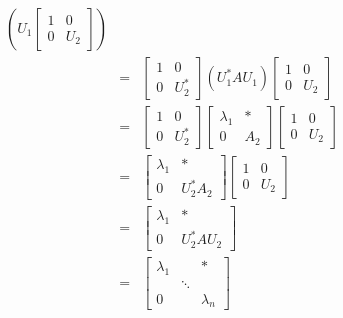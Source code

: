 \documentclass[letterpaper,12pt,fleqn]{article}
\renewcommand{\l}{\lambda}
\begin{document}
\begin{theproof}
\begin{description}
\begin{eqnarray*}
      \left(U_1\begin{bmatrix} 1 & 0 \\ 0 & U_2 \end{bmatrix}\right) \\
      &=& \begin{bmatrix} 1 & 0 \\ 0 & U_2^* \end{bmatrix}(U_1^*AU_1)
      \begin{bmatrix} 1 & 0 \\ 0 & U_2 \end{bmatrix} \\
      &=& \begin{bmatrix} 1 & 0 \\ 0 & U_2^* \end{bmatrix}
      \begin{bmatrix} \l_1 & * \\ 0 & A_2 \end{bmatrix}
      \begin{bmatrix} 1 & 0 \\ 0 & U_2 \end{bmatrix} \\
      &=& \begin{bmatrix} \l_1 & * \\ 0 & U_2^*A_2 \end{bmatrix}
      \begin{bmatrix} 1 & 0 \\ 0 & U_2 \end{bmatrix} \\
      &=& \begin{bmatrix} \l_1 & * \\ 0 & U_2^*AU_2 \end{bmatrix} \\
      &=& \begin{bmatrix} \l_1 & & * \\ & \ddots & \\ 0 & & \l_n \end{bmatrix}
    \end{eqnarray*}
  \end{description}
\end{theproof}
\end{document}
